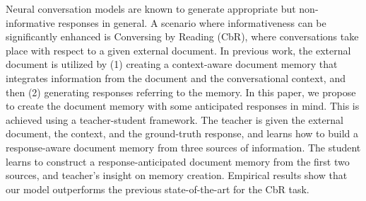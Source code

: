 Neural conversation models are known to generate appropriate but non-informative responses in general. A scenario where informativeness can be significantly enhanced is Conversing by Reading (CbR), where conversations take place with respect to a given external document. In previous work, the external document is utilized by (1) creating a context-aware document memory that integrates information from the document and the conversational context, and then (2) generating responses referring to the memory. In this paper, we propose to create the document memory with some anticipated responses in mind. This is achieved using a teacher-student framework. The teacher is given the external document, the context, and the ground-truth response, and learns how to build a response-aware document memory from three sources of information. The student learns to construct a response-anticipated document memory from the first two sources, and teacher's insight on memory creation. Empirical results show that our model outperforms the previous state-of-the-art for the CbR task.
